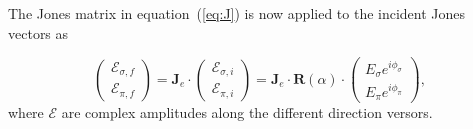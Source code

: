 \documentclass{iucr}
\begin{document}



The Jones matrix in equation~(\ref{eq:J}) is now applied to the incident Jones vectors as

\begin{equation}\label{eq:JR}
  \left( \begin{array}{c}
    \mathcal{E}_{\sigma,f} \\
    \mathcal{E}_{\pi,f}
  \end{array} \right)
  =
    \textbf{J}_e \cdot
  \left( \begin{array}{c}
    \mathcal{E}_{\sigma,i} \\
    \mathcal{E}_{\pi,i}
  \end{array} \right)
  =
  \textbf{J}_e \cdot \textbf{R}(\alpha) \cdot
  \left( \begin{array}{c}
    E_{\sigma} e^{i \phi_{\sigma}} \\
    E_{\pi} e^{i \phi_{\pi}}
  \end{array} \right),
\end{equation}
where $\mathcal{E}$ are complex amplitudes along the different direction versors.
\end{document}
